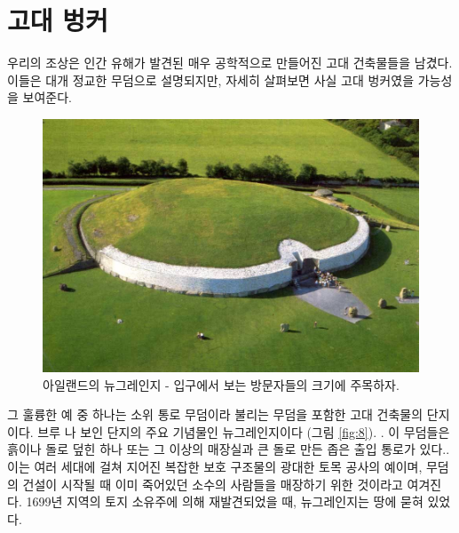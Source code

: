 \documentclass[10pt,twocolumn,letterpaper]{article}
\begin{document}
\section{고대 벙커}

우리의 조상은 인간 유해가 발견된 매우 공학적으로 만들어진 고대 건축물들을 남겼다. 이들은 대개 정교한 무덤으로 설명되지만, 자세히 살펴보면 사실 고대 벙커였을 가능성을 보여준다.

\begin{figure}[b]
\begin{center}
   \includegraphics[width=1\linewidth]{ww19.jpg}
\end{center}
   \caption{아일랜드의 뉴그레인지 - 입구에서 보는 방문자들의 크기에 주목하자.}
\label{fig:8}
\label{fig:onecol}
\end{figure}

그 훌륭한 예 중 하나는 소위 통로 무덤이라 불리는 무덤을 포함한 고대 건축물의 단지이다. 브루 나 보인 단지의 주요 기념물인 뉴그레인지이다 (그림 \ref{fig:8}). . 이 무덤들은 흙이나 돌로 덮힌 하나 또는 그 이상의 매장실과  큰 돌로 만든 좁은 출입 통로가 있다.\cite{70}. 이는 여러 세대에 걸쳐 지어진 복잡한 보호 구조물의 광대한 토목 공사의 예이며, 무덤의 건설이 시작될 때 이미 죽어있던 소수의 사람들을 매장하기 위한 것이라고 여겨진다. 1699년 지역의 토지 소유주에 의해 재발견되었을 때, 뉴그레인지는 땅에 묻혀 있었다.
\end{document}

